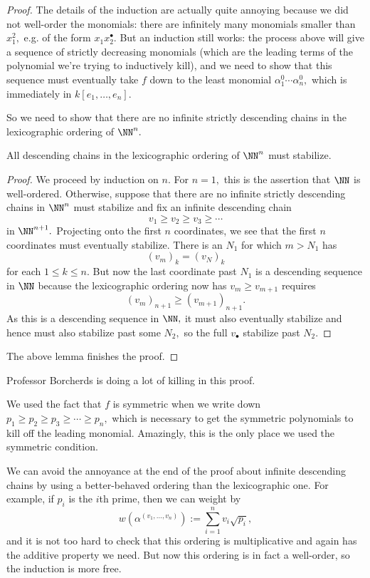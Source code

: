 \begin{proof}
	The details of the induction are actually quite annoying because we did not well-order the monomials: there are infinitely many monomials smaller than $x_1^2,$ e.g. of the form $x_1x_2^\bullet.$ But an induction still works: the process above will give a sequence of strictly decreasing monomials (which are the leading terms of the polynomial we're trying to inductively kill), and we need to show that this sequence must eventually take $f$ down to the least monomial $\alpha_1^0\cdots\alpha_n^0,$ which is immediately in $k[e_1,\ldots,e_n].$
	
	So we need to show that there are no infinite strictly descending chains in the lexicographic ordering of $\NN^n.$
	\begin{lemma}
		All descending chains in the lexicographic ordering of $\NN^n$ must stabilize.
	\end{lemma}
	\begin{proof}
		We proceed by induction on $n.$ For $n=1,$ this is the assertion that $\NN$ is well-ordered. Otherwise, suppose that there are no infinite strictly descending chains in $\NN^n$ must stabilize and fix an infinite descending chain
		\[v_1\ge v_2\ge v_3\ge\cdots\]
		in $\NN^{n+1}.$ Projecting onto the first $n$ coordinates, we see that the first $n$ coordinates must eventually stabilize. There is an $N_1$ for which $m>N_1$ has
		\[(v_m)_k=(v_N)_k\]
		for each $1\le k\le n.$ But now the last coordinate past $N_1$ is a descending sequence in $\NN$ because the lexicographic ordering now has $v_m\ge v_{m+1}$ requires
		\[(v_m)_{n+1}\ge(v_{m+1})_{n+1}.\]
		As this is a descending sequence in $\NN,$ it must also eventually stabilize and hence must also stabilize past some $N_2,$ so the full $v_\bullet$ stabilize past $N_2.$
	\end{proof}
	The above lemma finishes the proof.
\end{proof}
\begin{remark}
	Professor Borcherds is doing a lot of killing in this proof.
\end{remark}
\begin{remark}
	We used the fact that $f$ is symmetric when we write down $p_1\ge p_2\ge p_3\ge\cdots\ge p_n,$ which is necessary to get the symmetric polynomials to kill off the leading monomial. Amazingly, this is the only place we used the symmetric condition.
\end{remark}
\begin{remark}[Nir] \label{rem:betterord}
	We can avoid the annoyance at the end of the proof about infinite descending chains by using a better-behaved ordering than the lexicographic one. For example, if $p_i$ is the $i$th prime, then we can weight by
	\[w\left(\alpha^{(v_1,\ldots,v_n)}\right):=\sum_{i=1}^nv_i\sqrt{p_i},\]
	and it is not too hard to check that this ordering is multiplicative and again has the additive property we need. But now this ordering is in fact a well-order, so the induction is more free.
\end{remark}

